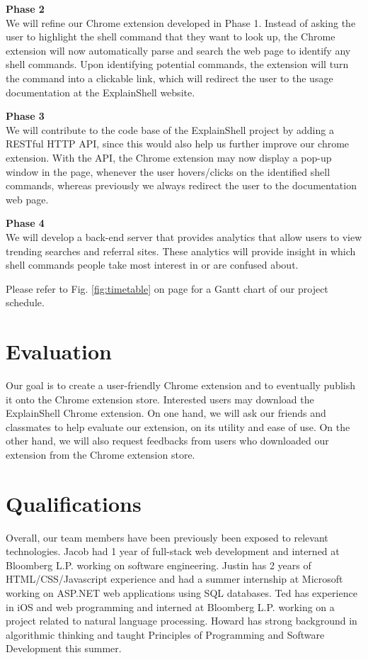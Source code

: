 \documentclass[11pt]{article}
\begin{document}
\par{\bf Phase 2}\\
We will refine our Chrome extension developed in Phase 1. Instead of asking the user to highlight the shell command that they want to look up, the Chrome extension will now automatically parse and search the web page to identify any shell commands. Upon identifying potential commands, the extension will turn the command into a clickable link, which will redirect the user to the usage documentation at the ExplainShell website.

\par{\bf Phase 3}\\
We will contribute to the code base of the ExplainShell project by adding a RESTful HTTP API, since this would also help us further improve our chrome extension. With the API, the Chrome extension may now display a pop-up window in the page, whenever the user hovers/clicks on the identified shell commands, whereas previously we always redirect the user to the documentation web page.

\par{\bf Phase 4}\\
We will develop a back-end server that provides analytics that allow users to view trending searches and referral sites. These analytics will provide insight in which shell commands people take most interest in or are confused about.

Please refer to Fig. \ref{fig:timetable} on page \pageref{fig:timetable} for a Gantt chart of our project schedule.

\section{Evaluation}

Our goal is to create a user-friendly Chrome extension and to eventually publish it onto the Chrome extension store. Interested users may download the ExplainShell Chrome extension. On one hand, we will ask our friends and classmates to help evaluate our extension, on its utility and ease of use. On the other hand, we will also request feedbacks from users who downloaded our extension from the Chrome extension store.

\section{Qualifications}

Overall, our team members have been previously been exposed to relevant technologies. Jacob had 1 year of full-stack web development and interned at Bloomberg L.P. working on software engineering. Justin has 2 years of HTML/CSS/Javascript experience and had a summer internship at Microsoft working on ASP.NET web applications using SQL databases. Ted has experience in iOS and web programming and interned at Bloomberg L.P. working on a project related to natural language processing. Howard has strong background in algorithmic thinking and taught Principles of Programming and Software Development this summer. 
\end{document}
